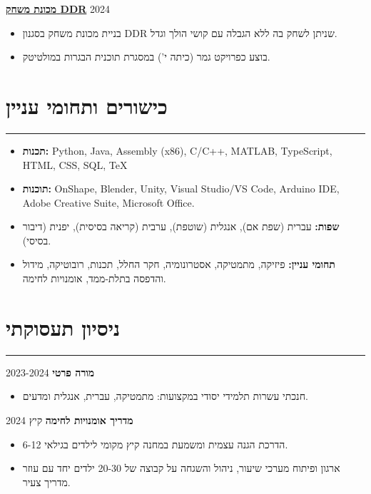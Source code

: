 \documentclass[11pt, a4paper]{article}
\begin{document}
\begin{hebrew}
\vspace{5pt}

\noindent \textbf{\href{https://docs.google.com/presentation/d/1aNJTU6BUvC1FYdzTdPDngVhVzPhTuTnGcDsX0PqvBGc/edit?usp=sharing}{מכונת משחק \textenglish{DDR}}} \hfill \textenglish{2024}
\begin{itemize}[itemsep=2pt, parsep=0pt, topsep=2pt]
    \item בניית מכונת משחק בסגנון \textenglish{DDR} שניתן לשחק בה ללא הגבלה עם קושי הולך וגדל.
    \item בוצע כפרויקט גמר (כיתה י') במסגרת תוכנית הבגרות במולטיטק.
    \newline
\end{itemize}

\section*{כישורים ותחומי עניין}
\hrule \vspace{8pt}

\begin{itemize}[itemsep=2pt, parsep=0pt, topsep=2pt]
    \item \textbf{תכנות:} \textenglish{Python, Java, Assembly (x86), C/C++, MATLAB, TypeScript, HTML, CSS, SQL, TeX}
    \item \textbf{תוכנות:} \textenglish{OnShape, Blender, Unity, Visual Studio/VS Code, Arduino IDE, Adobe Creative Suite, Microsoft Office}.
    \item \textbf{שפות:} עברית (שפת אם), אנגלית (שוטפת), ערבית (קריאה בסיסית), יפנית (דיבור בסיסי).
    \item \textbf{תחומי עניין:} פיזיקה, מתמטיקה, אסטרונומיה, חקר החלל, תכנות, רובוטיקה, מידול והדפסה בתלת-ממד, אומנויות לחימה.
\end{itemize}

\section*{ניסיון תעסוקתי}
\hrule \vspace{8pt}

\noindent \textbf{מורה פרטי} \hfill \textenglish{2023-2024}
\begin{itemize}[itemsep=2pt, parsep=0pt, topsep=2pt]
    \item חנכתי עשרות תלמידי יסודי במקצועות: מתמטיקה, עברית, אנגלית ומדעים.
\end{itemize}

\vspace{5pt}

\noindent \textbf{מדריך אומנויות לחימה} \hfill קיץ \textenglish{2024}
\begin{itemize}[itemsep=2pt, parsep=0pt, topsep=2pt]
    \item הדרכת הגנה עצמית ומשמעת במחנה קיץ מקומי לילדים בגילאי 6-12.
    \item ארגון ופיתוח מערכי שיעור, ניהול והשגחה על קבוצה של 20-30 ילדים יחד עם עוזר מדריך צעיר.
\end{itemize}

\end{hebrew}
\newpage
\end{document}
